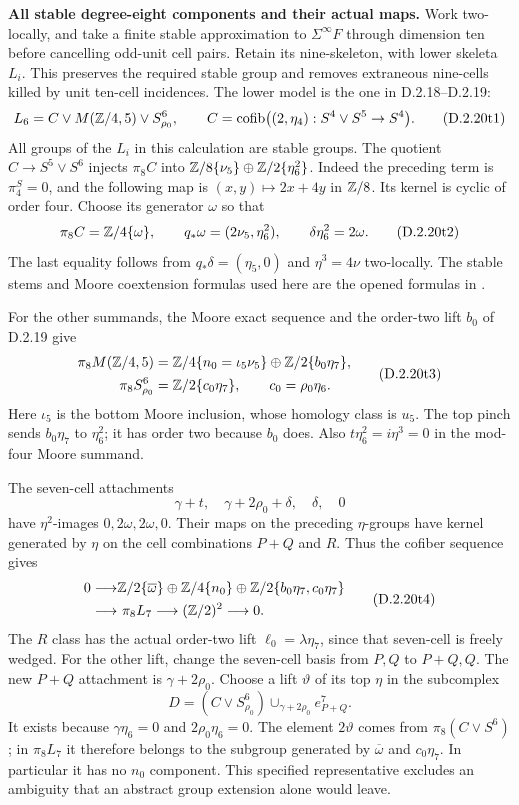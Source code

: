 \medskip\noindent
\textbf{All stable degree-eight components and their actual maps.}
Work two-locally, and take a finite stable approximation to
$\Sigma^\infty F$ through dimension ten before cancelling odd-unit
cell pairs. Retain its nine-skeleton, with lower skeleta $L_i$.
This preserves the required stable group and removes extraneous
nine-cells killed by unit ten-cell incidences. The lower model is
the one in D.2.18--D.2.19:
\[
 L_6=C\vee M(\mathbb Z/4,5)\vee S^6_{\rho_0},
 \qquad
 C=\operatorname{cofib}\bigl((2,\eta_4):S^4\vee S^5\to S^4\bigr).
 \tag{D.2.20t1}
\]
All groups of the $L_i$ in this calculation are stable groups.
The quotient $C\to S^5\vee S^6$ injects $\pi_8C$ into
$\mathbb Z/8\{\nu_5\}\oplus\mathbb Z/2\{\eta_6^2\}$.
Indeed the preceding term is $\pi_4^S=0$, and the following
map is $(x,y)\mapsto2x+4y$ in $\mathbb Z/8$.
Its kernel is cyclic of order four. Choose its generator $\omega$
so that
\[
 \pi_8C=\mathbb Z/4\{\omega\},\qquad
 q_*\omega=(2\nu_5,\eta_6^2),\qquad
 \delta\eta_6^2=2\omega.
 \tag{D.2.20t2}
\]
The last equality follows from $q_*\delta=(\eta_5,0)$ and
$\eta^3=4\nu$ two-locally. The stable stems and Moore
coextension formulas used here are the opened formulas in
\cite[\S2, (2.1)--(2.2), p.~149]{I_Oka1986}.

For the other summands, the Moore exact sequence and the
order-two lift $b_0$ of D.2.19 give
\[
\begin{split}
 \pi_8M(\mathbb Z/4,5)
   &=\mathbb Z/4\{n_0=\iota_5\nu_5\}
       \oplus\mathbb Z/2\{b_0\eta_7\},\\
 \pi_8S^6_{\rho_0}&=\mathbb Z/2\{c_0\eta_7\},
       \qquad c_0=\rho_0\eta_6.
\end{split}
 \tag{D.2.20t3}
\]
Here $\iota_5$ is the bottom Moore inclusion, whose
homology class is $u_5$.
The top pinch sends $b_0\eta_7$ to $\eta_6^2$;
it has order two because $b_0$ does.
Also $t\eta_6^2=i\eta^3=0$ in the mod-four Moore summand.

The seven-cell attachments
\[
 \gamma+t,\quad \gamma+2\rho_0+\delta,\quad\delta,\quad0
\]
have $\eta^2$-images $0,2\omega,2\omega,0$.
Their maps on the preceding $\eta$-groups have kernel
generated by $\eta$ on the cell combinations $P+Q$ and $R$.
Thus the cofiber sequence gives
\[
\begin{split}
 0\longrightarrow&
 \mathbb Z/2\{\overline\omega\}\oplus\mathbb Z/4\{n_0\}
 \oplus\mathbb Z/2\{b_0\eta_7,c_0\eta_7\}\\
 \longrightarrow&\ \pi_8L_7
 \longrightarrow (\mathbb Z/2)^2\longrightarrow0.
\end{split}
 \tag{D.2.20t4}
\]
The $R$ class has the actual order-two lift
$\ell_0=\lambda\eta_7$, since that seven-cell is freely wedged.
For the other lift, change the seven-cell basis from $P,Q$ to
$P+Q,Q$. The new $P+Q$ attachment is $\gamma+2\rho_0$.
Choose a lift $\vartheta$ of its top $\eta$ in the subcomplex
\[
 D=(C\vee S^6_{\rho_0})
          \mathop{\cup}_{\gamma+2\rho_0}e^7_{P+Q}.
 \tag{D.2.20t5}
\]
It exists because $\gamma\eta_6=0$ and $2\rho_0\eta_6=0$.
The element $2\vartheta$ comes from $\pi_8(C\vee S^6)$;
in $\pi_8L_7$ it therefore belongs to the subgroup generated
by $\overline\omega$ and $c_0\eta_7$. In particular it has
no $n_0$ component. This specified representative excludes
an ambiguity that an abstract group extension alone would leave.

